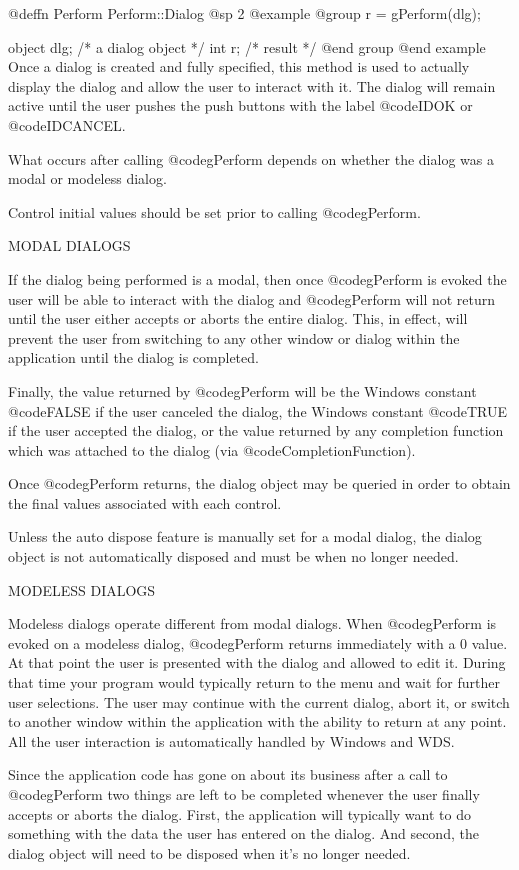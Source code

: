 @deffn {Perform} Perform::Dialog
@sp 2
@example
@group
r = gPerform(dlg);

object  dlg;    /*  a dialog object  */
int     r;      /*  result           */
@end group
@end example
Once a dialog is created and fully specified, this method is used to
actually display the dialog and allow the user to interact with it.
The dialog will remain active until the user pushes the push buttons
with the label @code{IDOK} or @code{IDCANCEL}.

What occurs after calling @code{gPerform} depends on whether the dialog
was a modal or modeless dialog.

Control initial values should be set prior to calling @code{gPerform}.

MODAL DIALOGS

If the dialog being performed is a modal, then once @code{gPerform} is
evoked the user will be able to interact with the dialog and @code{gPerform}
will not return until the user either accepts or aborts the entire dialog.
This, in effect, will prevent the user from switching to any other window
or dialog within the application until the dialog is completed.

Finally, the value returned by @code{gPerform} will be the Windows
constant @code{FALSE} if the user canceled the dialog, the Windows
constant @code{TRUE} if the user accepted the dialog, or the
value returned by any completion function which was attached to the
dialog (via @code{CompletionFunction}).

Once @code{gPerform} returns, the dialog object may be queried in
order to obtain the final values associated with each control.

Unless the auto dispose feature is manually set for a modal dialog,
the dialog object is not automatically disposed and must be when
no longer needed.

MODELESS DIALOGS

Modeless dialogs operate different from modal dialogs.  When
@code{gPerform} is evoked on a modeless dialog, @code{gPerform} returns
immediately with a 0 value.  At that point the user is presented with the
dialog and allowed to edit it.  During that time your program would typically
return to the menu and wait for further user selections.  The user may
continue with the current dialog, abort it, or switch to another window
within the application with the ability to return at any point.  All the
user interaction is automatically handled by Windows and WDS.

Since the application code has gone on about its business after a call
to @code{gPerform} two things are left to be completed whenever the user
finally accepts or aborts the dialog.  First, the application will
typically want to do something with the data the user has entered on the
dialog.  And second, the dialog object will need to be disposed when
it's no longer needed.

